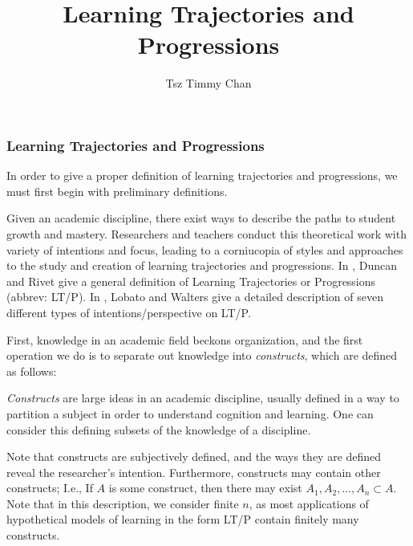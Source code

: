\documentclass{TC}
\title{Learning Trajectories and Progressions}	%
\author{Tsz Timmy Chan}	%
\begin{document}
\subsubsection{Learning Trajectories and Progressions}
In order to give a proper definition of learning trajectories and progressions, we must first begin with preliminary definitions.

Given an academic discipline, there exist ways to describe the paths to student growth and mastery. Researchers and teachers conduct this theoretical work with variety of intentions and focus, leading to a corniucopia of styles and approaches to the study and creation of learning trajectories and progressions. In  \parencite{duncan_learning_2018}, Duncan and Rivet give a general definition of Learning Trajectories or Progressions (abbrev: LT/P). In \parencite{lobato_taxonomy_2017}, Lobato and Walters give a detailed description of seven different types of intentions/perspective on LT/P. 
 
First, knowledge in an academic field beckons organization, and the first operation we do is to separate out knowledge into \emph{constructs}, which are defined as follows:

\begin{mdframed}
\begin{definition}[Construct]
\emph{Constructs} are large ideas in an academic discipline, usually defined in a way to partition a subject in order to understand cognition and learning. One can consider this defining subsets of the knowledge of a discipline.  \end{definition}
\end{mdframed}

Note that constructs are subjectively defined, and the ways they are defined reveal the researcher's intention. Furthermore, constructs may contain other constructs; I.e., If $A$ is some construct, then there may exist $A_1, A_2, \ldots, A_n \subset A$. Note that in this description, we consider finite $n$, as most applications of hypothetical models of learning in the form LT/P contain finitely many constructs.
\end{document}
